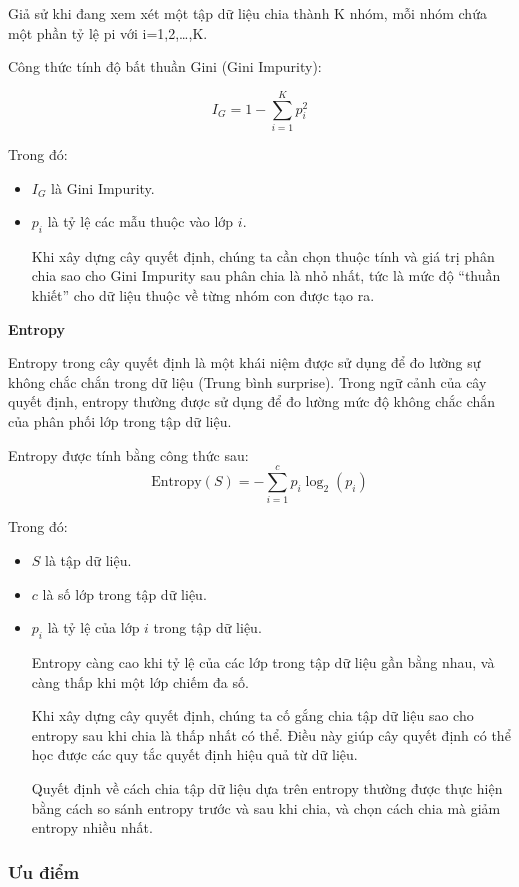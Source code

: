 \documentclass[
]{article}
\begin{document}
Giả sử khi đang xem xét một tập dữ liệu chia thành K nhóm, mỗi nhóm chứa
một phần tỷ lệ pi với i=1,2,\ldots,K.

Công thức tính độ bất thuần Gini (Gini Impurity):

\[
I_G = 1 - \sum_{i=1}^{K} p_i^2
\]

Trong đó:

\begin{itemize}
\item
  \emph{\(I_G\)} là Gini Impurity.
\item
  \emph{\(p_i\)} là tỷ lệ các mẫu thuộc vào lớp \emph{\(i\)}.

  Khi xây dựng cây quyết định, chúng ta cần chọn thuộc tính và giá trị
  phân chia sao cho Gini Impurity sau phân chia là nhỏ nhất, tức là mức
  độ ``thuần khiết'' cho dữ liệu thuộc về từng nhóm con được tạo ra.
\end{itemize}

\textbf{Entropy}

Entropy trong cây quyết định là một khái niệm được sử dụng để đo lường
sự không chắc chắn trong dữ liệu (Trung bình surprise). Trong ngữ cảnh
của cây quyết định, entropy thường được sử dụng để đo lường mức độ không
chắc chắn của phân phối lớp trong tập dữ liệu.

Entropy được tính bằng công thức sau: \[
\text{Entropy}(S) = - \sum_{i=1}^{c} p_i \log_2(p_i)
\]

Trong đó:

\begin{itemize}
\item
  \emph{\(S\)} là tập dữ liệu.
\item
  \emph{\(c\)} là số lớp trong tập dữ liệu.
\item
  \emph{\(p_i\)} là tỷ lệ của lớp \emph{\(i\)} trong tập dữ liệu.

  Entropy càng cao khi tỷ lệ của các lớp trong tập dữ liệu gần bằng
  nhau, và càng thấp khi một lớp chiếm đa số.

  Khi xây dựng cây quyết định, chúng ta cố gắng chia tập dữ liệu sao cho
  entropy sau khi chia là thấp nhất có thể. Điều này giúp cây quyết định
  có thể học được các quy tắc quyết định hiệu quả từ dữ liệu.

  Quyết định về cách chia tập dữ liệu dựa trên entropy thường được thực
  hiện bằng cách so sánh entropy trước và sau khi chia, và chọn cách
  chia mà giảm entropy nhiều nhất.
\end{itemize}

\subsubsection{Ưu điểm}\label{ux1b0u-ux111iux1ec3m-2}
\end{document}
